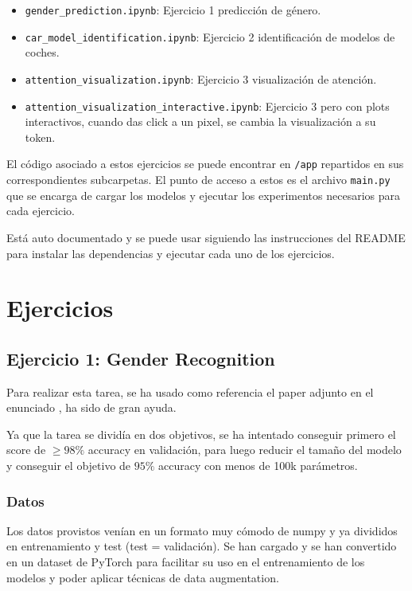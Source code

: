 \documentclass[11pt,spanish,listoffigures,listoftables]{tfgetsinf}
\begin{document}
\begin{itemize}
  \item \texttt{gender\_prediction.ipynb}: Ejercicio 1 predicción de género.
  \item \texttt{car\_model\_identification.ipynb}: Ejercicio 2 identificación de modelos de coches.
  \item \texttt{attention\_visualization.ipynb}: Ejercicio 3 visualización de atención.
  \item \texttt{attention\_visualization\_interactive.ipynb}: Ejercicio 3 pero con plots interactivos, cuando das click a un pixel, se cambia la visualización a su token.
\end{itemize}

 El código asociado a estos ejercicios se puede encontrar en \texttt{/app} repartidos en sus correspondientes subcarpetas. El punto de acceso a estos es el archivo \texttt{main.py} que se encarga de cargar los modelos y ejecutar los experimentos necesarios para cada ejercicio.

 Está auto documentado y se puede usar siguiendo las instrucciones del README para instalar las dependencias y ejecutar cada uno de los ejercicios.

\chapter{Ejercicios}
\section{Ejercicio 1: Gender Recognition}

Para realizar esta tarea, se ha usado como referencia el paper adjunto en el enunciado \cite{antipov2016minimalistic}, ha sido de gran ayuda.

Ya que la tarea se dividía en dos objetivos, se ha intentado conseguir primero el score de $\geq 98\%$ accuracy en validación, para luego reducir el tamaño del modelo y conseguir el objetivo de $95\%$ accuracy con menos de 100k parámetros.

\subsection{Datos}
Los datos provistos venían en un formato muy cómodo de numpy y ya divididos en entrenamiento y test (test = validación). Se han cargado y se han convertido en un dataset de PyTorch para facilitar su uso en el entrenamiento de los modelos y poder aplicar técnicas de data augmentation.
\end{document}
